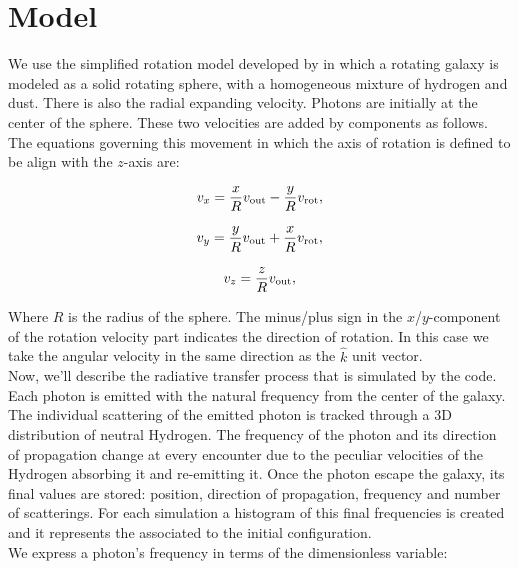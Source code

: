 \setcounter{equation}{0}
\chapter{Model}

We use the simplified rotation model developed by \cite{Garavito14} in which a rotating galaxy is modeled as a solid rotating sphere, with a homogeneous mixture of hydrogen and dust. There is also the radial expanding velocity. Photons are initially at the center of the sphere. These two velocities are added by components as follows. The equations governing this movement in which the axis of rotation is defined to be align with the $z$-axis are: 

\begin{equation}
v_{x}=\frac{x}{R}v_{\rm out}-\frac{y}{R}v_{\rm rot}, \label{subeq1}
\end{equation}

\begin{equation}
v_{y}=\frac{y}{R}v_{\rm out}+\frac{x}{R}v_{\rm rot}, \label{subeq2}
\end{equation}

\begin{equation}
v_{z}=\frac{z}{R}v_{\rm out}, \label{subeq3}
\end{equation}

Where $R$ is the radius of the sphere. The minus/plus sign in the $x$/$y$-component of the rotation velocity part indicates the direction of rotation. In this case we take the angular velocity in the same direction as the $\hat{k}$ unit vector. \\

Now, we'll describe the radiative transfer process that is simulated by the code. Each photon is emitted with the natural \lya frequency from the center of the galaxy. The individual scattering of the emitted photon is tracked through a 3D distribution of neutral Hydrogen. The frequency of the photon and its direction of propagation change at every encounter due to the peculiar velocities of the Hydrogen absorbing it and re-emitting it. Once the photon escape the galaxy, its final values are stored: position, direction of propagation, frequency and number of scatterings. For each simulation a histogram of this final frequencies is created and it represents the \lya associated to the initial configuration.\\

We express a photon's frequency in terms of the dimensionless variable:

